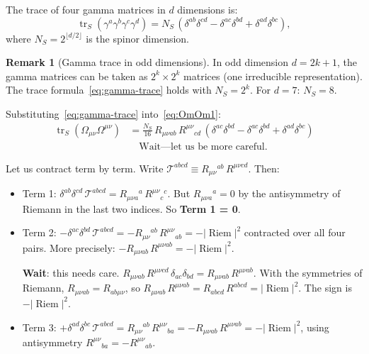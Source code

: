 \documentclass[12pt,a4paper]{article}
\theoremstyle{definition}
\newtheorem{remark}{Remark}
\DeclareMathOperator{\tr}{tr}
\DeclareMathOperator{\Riem}{Riem}
\begin{document}
The trace of four gamma matrices in $d$ dimensions is:
\begin{equation}\label{eq:gamma-trace}
\tr_S(\gamma^a\gamma^b\gamma^c\gamma^d) =
N_S\,(\delta^{ab}\delta^{cd} - \delta^{ac}\delta^{bd} +
\delta^{ad}\delta^{bc}),
\end{equation}
where $N_S = 2^{\lfloor d/2 \rfloor}$ is the spinor dimension.

\begin{remark}[Gamma trace in odd dimensions]
In odd dimension $d = 2k+1$, the gamma matrices can be taken as
$2^k \times 2^k$ matrices (one irreducible representation).  The
trace formula~\eqref{eq:gamma-trace} holds with $N_S = 2^k$.  For
$d = 7$: $N_S = 8$.
\end{remark}

Substituting~\eqref{eq:gamma-trace} into~\eqref{eq:OmOm1}:
\begin{align}
\tr_S(\Omega_{\mu\nu}\Omega^{\mu\nu})
  &= \frac{N_S}{16}\,R_{\mu\nu ab}\,R^{\mu\nu}{}_{cd}\,
  (\delta^{ac}\delta^{bd} - \delta^{ac}\delta^{bd} +
  \delta^{ad}\delta^{bc}) \nonumber\\
  &\quad\text{Wait---let us be more careful.}
\end{align}

Let us contract term by term.  Write
$\mathcal{T}^{abcd} \equiv R_{\mu\nu}{}^{ab}\,R^{\mu\nu cd}$.
Then:
\begin{itemize}
\item Term 1: $\delta^{ab}\delta^{cd}\,\mathcal{T}^{abcd}
  = R_{\mu\nu a}{}^a\,R^{\mu\nu}{}_c{}^c$.  But
  $R_{\mu\nu a}{}^a = 0$ by the antisymmetry of Riemann in the last
  two indices.  So \textbf{Term 1 = 0}.

\item Term 2: $-\delta^{ac}\delta^{bd}\,\mathcal{T}^{abcd}
  = -R_{\mu\nu}{}^{ab}\,R^{\mu\nu}{}_{ab} = -|\Riem|^2$
  contracted over all four pairs.  More precisely:
  $-R_{\mu\nu ab}\,R^{\mu\nu ab} = -|\Riem|^2$.

  \textbf{Wait}: this needs care.
  $R_{\mu\nu ab}\,R^{\mu\nu cd}\,\delta_{ac}\delta_{bd}
  = R_{\mu\nu ab}\,R^{\mu\nu ab}$.  With the symmetries of
  Riemann, $R_{\mu\nu ab} = R_{ab\mu\nu}$, so
  $R_{\mu\nu ab}\,R^{\mu\nu ab} = R_{abcd}\,R^{abcd} = |\Riem|^2$.
  The sign is $-|\Riem|^2$.

\item Term 3: $+\delta^{ad}\delta^{bc}\,\mathcal{T}^{abcd}
  = R_{\mu\nu}{}^{ab}\,R^{\mu\nu}{}_{ba}
  = -R_{\mu\nu ab}\,R^{\mu\nu ab} = -|\Riem|^2$,
  using antisymmetry $R^{\mu\nu}{}_{ba} = -R^{\mu\nu}{}_{ab}$.
\end{itemize}
\end{document}
